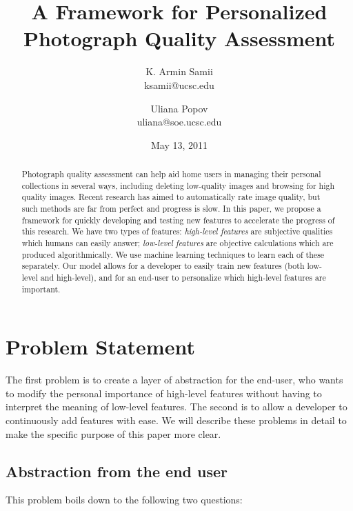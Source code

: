 \documentclass[10pt,twocolumn]{article}
\title{A Framework for Personalized Photograph Quality Assessment}
\author{
K. Armin Samii \\
ksamii@ucsc.edu
\and
Uliana Popov \\
uliana@soe.ucsc.edu}
\date{May 13, 2011}
\begin{document}
\maketitle
\begin{abstract}
Photograph quality assessment can help aid home users in managing their personal collections in several ways, including deleting low-quality images and browsing for high quality images. Recent research has aimed to automatically rate image quality, but such methods are far from perfect and progress is slow. In this paper, we propose a framework for quickly developing and testing new features to accelerate the progress of this research. We have two types of features: \textit{high-level features} are subjective qualities which humans can easily answer; \textit{low-level features} are objective calculations which are produced algorithmically. We use machine learning techniques to learn each of these separately. Our model allows for a developer to easily train new features (both low-level and high-level), and for an end-user to personalize which high-level features are important.



\end{abstract}

\section{Problem Statement}
The first problem is to create a layer of abstraction for the end-user, who wants to modify the personal importance of high-level features without having to interpret the meaning of low-level features. The second is to allow a developer to continuously add features with ease. We will describe these problems in detail to make the specific purpose of this paper more clear.

\subsection{Abstraction from the end user}
This problem boils down to the following two questions:
\end{document}
